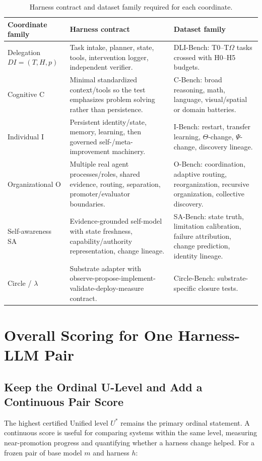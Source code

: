\documentclass[11pt]{article}
\theoremstyle{definition}
\newcommand{\Om}{\ensuremath{\Omega}}
\begin{document}
\begin{table}[H]
\centering\small
\begin{tabularx}{\textwidth}{@{}lYY@{}}
\toprule
Coordinate family & Harness contract & Dataset family \\
\midrule
Delegation $DI=(T,H,p)$ & Task intake, planner, state, tools, intervention logger, independent verifier. & DLI-Bench: T0--T\Om{} tasks crossed with H0--H5 budgets. \\
Cognitive C & Minimal standardized context/tools so the test emphasizes problem solving rather than persistence. & C-Bench: broad reasoning, math, language, visual/spatial or domain batteries. \\
Individual I & Persistent identity/state, memory, learning, then governed self-/meta-improvement machinery. & I-Bench: restart, transfer learning, $\Theta$-change, $\Psi$-change, discovery lineage. \\
Organizational O & Multiple real agent processes/roles, shared evidence, routing, separation, promoter/evaluator boundaries. & O-Bench: coordination, adaptive routing, reorganization, recursive organization, collective discovery. \\
Self-awareness SA & Evidence-grounded self-model with state freshness, capability/authority representation, change lineage. & SA-Bench: state truth, limitation calibration, failure attribution, change prediction, identity lineage. \\
Circle / $\lambda$ & Substrate adapter with observe-propose-implement-validate-deploy-measure contract. & Circle-Bench: substrate-specific closure tests. \\
\bottomrule
\end{tabularx}
\caption{Harness contract and dataset family required for each coordinate.}
\label{tab:contracts}
\end{table}

\section{Overall Scoring for One Harness-LLM Pair}

\subsection{Keep the Ordinal U-Level and Add a Continuous Pair Score}

The highest certified Unified level $U^{*}$ remains the primary ordinal statement. A continuous score is useful for comparing systems within the same level, measuring near-promotion progress and quantifying whether a harness change helped. For a frozen pair of base model $m$ and harness $h$:
\end{document}
